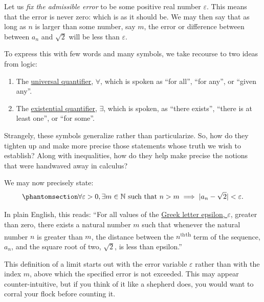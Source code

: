 \documentclass[
  a4paper,
]{article}
\begin{document}
Let us \emph{fix the admissible error} to be some positive real number
\(\varepsilon\). This means that the error is never zero: which is as it
should be. We may then say that as long as \(n\) is larger than some
number, say \(m\), the error or difference between between \(a_{n}\) and
\(\sqrt{2}\) will be less than \(\varepsilon\).

To express this with few words and many symbols, we take recourse to two
ideas from logic:

\begin{enumerate}
\def\labelenumi{\alph{enumi}.}
\item
  The
  \href{https://en.wikipedia.org/wiki/Universal_quantification}{universal
  quantifier}, \(\forall\), which is spoken as ``for all'', ``for any'',
  or ``given any''.
\item
  The
  \href{https://en.wikipedia.org/wiki/Existential_quantification}{existential
  quantifier}, \(\exists\), which is spoken, as ``there exists'',
  ``there is at least one'', or ``for some''.
\end{enumerate}

Strangely, these symbols generalize rather than particularize. So, how
do they tighten up and make more precise those statements whose truth we
wish to establish? Along with inequalities, how do they help make
precise the notions that were handwaved away in calculus?

We may now precisely state:
\begin{equation}\phantomsection\label{eq:epsilon}{
\forall \varepsilon > 0, \exists m \in \mathbb{N} \text{ such that } n > m \implies |a_{n} - \sqrt{2}| < \varepsilon.
}\end{equation}

In plain English, this reads: ``For all values of the
\href{https://mathworld.wolfram.com/Epsilon.html}{Greek letter epsilon,
\(\varepsilon\)}, greater than zero, there exists a natural number \(m\)
such that whenever the natural number \(n\) is greater than \(m\), the
distance between the \(n^{\textrm{th}}\)\textsuperscript{th} term of the
sequence, \(a_{n}\), and the square root of two, \(\sqrt{2}\), is less
than epsilon.''

This definition of a limit starts out with the error variable
\(\varepsilon\) rather than with the index \(m\), above which the
specified error is not exceeded. This may appear counter-intuitive, but
if you think of it like a shepherd does, you would want to corral your
flock before counting it.
\end{document}
